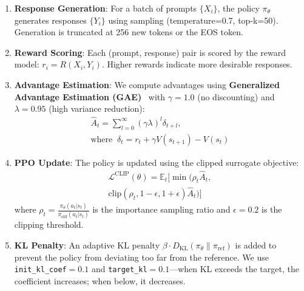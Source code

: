 \begin{enumerate}[leftmargin=*]
    \item \textbf{Response Generation}: For a batch of prompts $\{X_i\}$, the policy $\pi_\theta$ generates responses $\{Y_i\}$ using sampling (temperature=0.7, top-k=50). Generation is truncated at 256 new tokens or the EOS token.

    \item \textbf{Reward Scoring}: Each (prompt, response) pair is scored by the reward model: $r_i = R(X_i, Y_i)$. Higher rewards indicate more desirable responses.

    \item \textbf{Advantage Estimation}: We compute advantages using \textbf{Generalized Advantage Estimation (GAE)}~\cite{schulman2015high} with $\gamma=1.0$ (no discounting) and $\lambda=0.95$ (high variance reduction):
    {\small
    \begin{gather*}
        \hat{A}_t = \sum_{l=0}^{\infty} (\gamma \lambda)^l \delta_{t+l},\\
        \text{where}\;\; \delta_t = r_t + \gamma V(s_{t+1}) - V(s_t)
    \end{gather*}
    }

    \item \textbf{PPO Update}: The policy is updated using the clipped surrogate objective:
    {\small
    \begin{multline*}
        \mathcal{L}^{\text{CLIP}}(\theta) = \mathbb{E}_t \Big[ \min\big( \rho_t \hat{A}_t,\\
        \text{clip}(\rho_t, 1{-}\epsilon, 1{+}\epsilon) \hat{A}_t \big) \Big]
    \end{multline*}
    }
    where $\rho_t = \frac{\pi_\theta(a_t|s_t)}{\pi_{\text{old}}(a_t|s_t)}$ is the importance sampling ratio and $\epsilon=0.2$ is the clipping threshold.

    \item \textbf{KL Penalty}: An adaptive KL penalty $\beta \cdot D_{\text{KL}}(\pi_\theta \| \pi_{\text{ref}})$ is added to prevent the policy from deviating too far from the reference. We use \texttt{init\_kl\_coef}$=0.1$ and \texttt{target\_kl}$=0.1$---when KL exceeds the target, the coefficient increases; when below, it decreases.
\end{enumerate}

